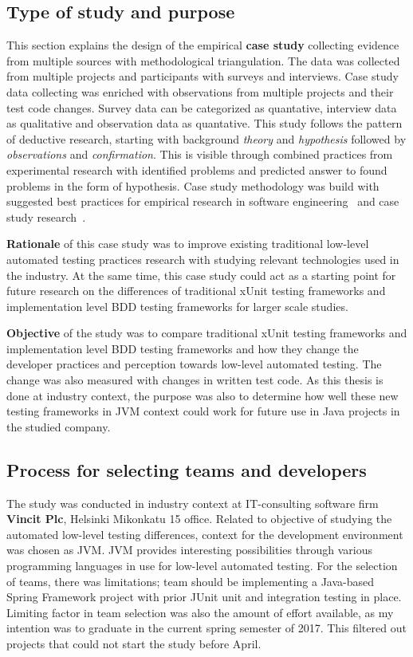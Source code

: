 \subsection{Type of study and purpose}
    This section explains the design of the empirical \textbf{case study} collecting evidence from multiple sources with methodological triangulation.
    The data was collected from multiple projects and participants with surveys and interviews.
    Case study data collecting was enriched with observations from
    multiple projects and their test code changes. Survey data can be categorized as quantative, interview data as qualitative and observation data as quantative.
    This study follows the pattern of deductive research, starting with background \textit{theory} and \textit{hypothesis} followed by
    \textit{observations} and \textit{confirmation}. This is visible through combined practices
    from experimental research with identified problems and predicted answer to found problems in the form of hypothesis.
    Case study methodology was build with suggested best practices for empirical research in software engineering~\cite{kitchenham2002preliminary} and case
    study research~\cite{runeson2012case}.

    \textbf{Rationale} of this case study was to improve existing traditional low-level automated testing practices research with studying
    relevant technologies used in the industry. At the same time, this case study could act as a starting point for future
    research on the differences of traditional xUnit testing frameworks and implementation level BDD testing frameworks for larger
    scale studies.

    \textbf{Objective} of the study was to compare traditional xUnit testing frameworks and implementation level BDD testing frameworks
    and how they change the developer practices and perception towards low-level automated testing. The change was also measured
    with changes in written test code.
    As this thesis is done at industry context, the purpose was also to determine how well these
    new testing frameworks in JVM context could work for future use in Java projects in the studied company.


\subsection{Process for selecting teams and developers}
    The study was conducted in industry context at IT-consulting software firm \textbf{Vincit Plc}, Helsinki Mikonkatu 15 office.
    Related to objective of studying the automated low-level testing differences, context for the development environment was chosen as JVM.
    JVM provides interesting possibilities through various programming languages in use for low-level automated testing.
    For the selection of teams, there was limitations; team should be implementing a Java-based Spring Framework project with prior JUnit
    unit and integration testing in place. Limiting factor in team selection was also the amount of effort available,
    as my intention was to graduate in the current spring semester of 2017.  This filtered out projects that could not start
    the study before April.

